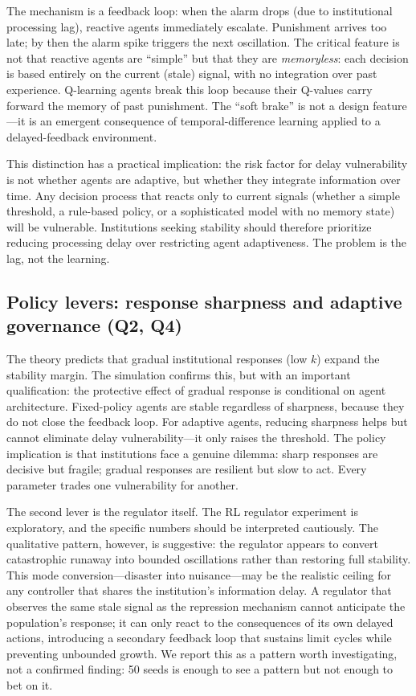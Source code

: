 The mechanism is a feedback loop: when the alarm drops (due to institutional processing lag), reactive agents immediately escalate. Punishment arrives too late; by then the alarm spike triggers the next oscillation. The critical feature is not that reactive agents are ``simple'' but that they are \emph{memoryless}: each decision is based entirely on the current (stale) signal, with no integration over past experience. Q-learning agents break this loop because their Q-values carry forward the memory of past punishment. The ``soft brake'' is not a design feature---it is an emergent consequence of temporal-difference learning applied to a delayed-feedback environment.

This distinction has a practical implication: the risk factor for delay vulnerability is not whether agents are adaptive, but whether they integrate information over time. Any decision process that reacts only to current signals (whether a simple threshold, a rule-based policy, or a sophisticated model with no memory state) will be vulnerable. Institutions seeking stability should therefore prioritize reducing processing delay over restricting agent adaptiveness. The problem is the lag, not the learning.

\subsection{Policy levers: response sharpness and adaptive governance (Q2, Q4)}

The theory predicts that gradual institutional responses (low $k$) expand the stability margin. The simulation confirms this, but with an important qualification: the protective effect of gradual response is conditional on agent architecture. Fixed-policy agents are stable regardless of sharpness, because they do not close the feedback loop. For adaptive agents, reducing sharpness helps but cannot eliminate delay vulnerability---it only raises the threshold. The policy implication is that institutions face a genuine dilemma: sharp responses are decisive but fragile; gradual responses are resilient but slow to act. Every parameter trades one vulnerability for another.

The second lever is the regulator itself. The RL regulator experiment is exploratory, and the specific numbers should be interpreted cautiously. The qualitative pattern, however, is suggestive: the regulator appears to convert catastrophic runaway into bounded oscillations rather than restoring full stability. This mode conversion---disaster into nuisance---may be the realistic ceiling for any controller that shares the institution's information delay. A regulator that observes the same stale signal as the repression mechanism cannot anticipate the population's response; it can only react to the consequences of its own delayed actions, introducing a secondary feedback loop that sustains limit cycles while preventing unbounded growth. We report this as a pattern worth investigating, not a confirmed finding: 50 seeds is enough to see a pattern but not enough to bet on it.

